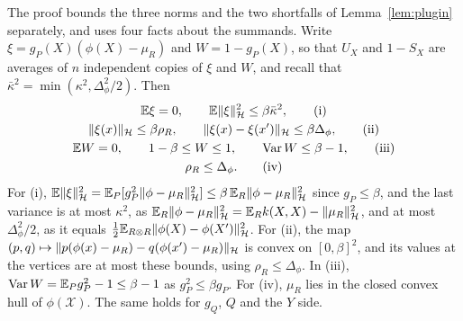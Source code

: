 The proof bounds the three norms and the two shortfalls of Lemma~\ref{lem:plugin} separately, and uses four facts
about the summands. Write $\xi=g_P(X)(\phi(X)-\mu_R)$ and $W=1-g_P(X)$, so that $U_X$ and $1-S_X$ are averages of $n$
independent copies of $\xi$ and $W$, and recall that $\bar\kappa^2=\min(\kappa^2,\Delta_\phi^2/2)$. Then
\begin{gather*}
\mathbb{E}\xi=0,\qquad\mathbb{E}\|\xi\|_{\mathcal{H}}^2\le\beta\bar\kappa^2, \tag{i}\\
\|\xi(x)\|_{\mathcal{H}}\le\beta\rho_R,\qquad\|\xi(x)-\xi(x')\|_{\mathcal{H}}\le\beta\Delta_\phi, \tag{ii}\\
\mathbb{E} W=0,\qquad 1-\beta\le W\le1,\qquad\operatorname{Var}W\le\beta-1, \tag{iii}\\
\rho_R\le\Delta_\phi . \tag{iv}
\end{gather*}
For (i), $\mathbb{E}\|\xi\|_{\mathcal{H}}^2=\mathbb{E}_P[g_P^2\|\phi-\mu_R\|_{\mathcal{H}}^2]\le\beta\,\mathbb{E}_R\|\phi-\mu_R\|_{\mathcal{H}}^2$ since $g_P\le\beta$, and the last
variance is at most $\kappa^2$, as $\mathbb{E}_R\|\phi-\mu_R\|_{\mathcal{H}}^2=\mathbb{E}_Rk(X,X)-\|\mu_R\|_{\mathcal{H}}^2$, and at most $\Delta_\phi^2/2$, as
it equals $\tfrac12\mathbb{E}_{R\otimes R}\|\phi(X)-\phi(X')\|_{\mathcal{H}}^2$. For (ii), the map
$(p,q)\mapsto\|p(\phi(x)-\mu_R)-q(\phi(x')-\mu_R)\|_{\mathcal{H}}$ is convex on $[0,\beta]^2$, and its values at the vertices are at
most these bounds, using $\rho_R\le\Delta_\phi$. In (iii),
$\operatorname{Var}W=\mathbb{E}_Pg_P^2-1\le\beta-1$ as $g_P^2\le\beta g_P$. For (iv), $\mu_R$ lies in the closed convex hull of
$\phi(\mathcal X)$. The same holds for $g_Q$, $Q$ and the $Y$ side.


